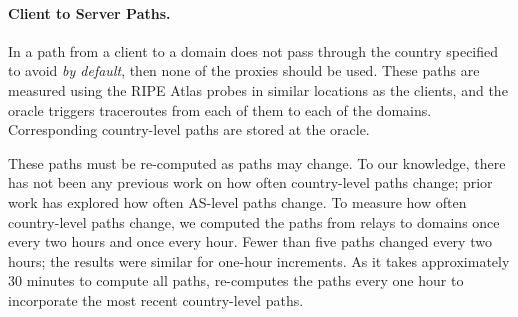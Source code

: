 \paragraph{Client to Server Paths.} In a path from a client to a 
domain does not pass through the country specified to avoid {\it by default}, 
then none of the proxies should be used.  
These paths are measured using the RIPE Atlas probes in similar
locations as the clients, and the oracle triggers traceroutes from
each of them to each of the domains.  Corresponding country-level
paths are stored at the oracle.

These paths must be re-computed 
as paths may change.  To our knowledge, there has not been any previous work 
on how often country-level paths change; prior work has explored how often 
AS-level paths change.  To measure how often country-level paths change, we 
computed the paths from relays to domains once every two hours and once every 
hour.  Fewer than five paths changed every two hours; the 
results were similar for one-hour increments.  As it takes approximately 30 minutes to 
compute all paths, \system{} re-computes the paths every one hour to incorporate 
the most recent country-level paths.




